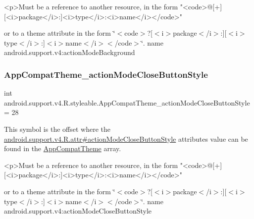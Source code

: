 \begin{DoxyVerb}      <p>Must be a reference to another resource, in the form "<code>@[+][<i>package</i>:]<i>type</i>:<i>name</i></code>"
\end{DoxyVerb}
 or to a theme attribute in the form \char`\"{}$<$code$>$?\mbox{[}$<$i$>$package$<$/i$>$\+:\mbox{]}\mbox{[}$<$i$>$type$<$/i$>$\+:\mbox{]}$<$i$>$name$<$/i$>$$<$/code$>$\char`\"{}.  name android.\+support.\+v4\+:action\+Mode\+Background \mbox{\label{classandroid_1_1support_1_1v4_1_1R_1_1styleable_a663f6400e9039cc3de0b0a345cc307d9}} 
\subsubsection{\texorpdfstring{App\+Compat\+Theme\+\_\+action\+Mode\+Close\+Button\+Style}{AppCompatTheme\_actionModeCloseButtonStyle}}
{\footnotesize\ttfamily int android.\+support.\+v4.\+R.\+styleable.\+App\+Compat\+Theme\+\_\+action\+Mode\+Close\+Button\+Style = 28\hspace{0.3cm}{\ttfamily [static]}}

This symbol is the offset where the \hyperlink{classandroid_1_1support_1_1v4_1_1R_1_1attr_af028384bcaaf01be4eb4a6a14490f887}{android.\+support.\+v4.\+R.\+attr\#action\+Mode\+Close\+Button\+Style} attribute\textquotesingle{}s value can be found in the \hyperlink{classandroid_1_1support_1_1v4_1_1R_1_1styleable_ac07ebbe62ed977f6dcaadc6397840ace}{App\+Compat\+Theme} array.

\begin{DoxyVerb}      <p>Must be a reference to another resource, in the form "<code>@[+][<i>package</i>:]<i>type</i>:<i>name</i></code>"
\end{DoxyVerb}
 or to a theme attribute in the form \char`\"{}$<$code$>$?\mbox{[}$<$i$>$package$<$/i$>$\+:\mbox{]}\mbox{[}$<$i$>$type$<$/i$>$\+:\mbox{]}$<$i$>$name$<$/i$>$$<$/code$>$\char`\"{}.  name android.\+support.\+v4\+:action\+Mode\+Close\+Button\+Style \mbox{\label{classandroid_1_1support_1_1v4_1_1R_1_1styleable_a235b884d67d38c23c9ce1e69aa79c7cc}} 
